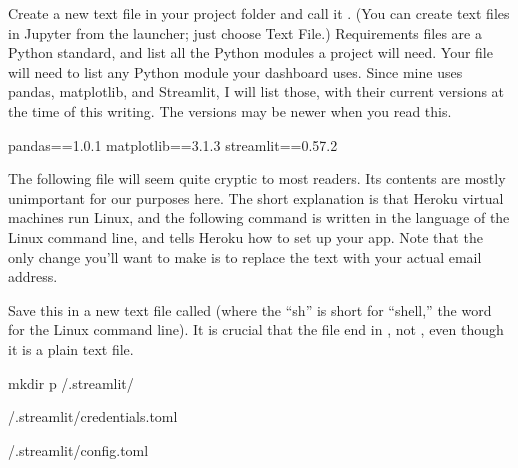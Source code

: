 \documentclass[letterpaper,10pt,english]{sphinxmanual}
\begin{document}
 Create a new text file in your project folder and call it .  (You can create text files in Jupyter from the launcher; just choose Text File.)  Requirements files are a Python standard, and list all the Python modules a project will need.  Your  file will need to list any Python module your dashboard uses.  Since mine uses pandas, matplotlib, and Streamlit, I will list those, with their current versions at the time of this writing.  The versions may be newer when you read this.

\begin{sphinxVerbatim}[commandchars=\\\{\}]
pandas==1.0.1
matplotlib==3.1.3
streamlit==0.57.2
\end{sphinxVerbatim}

 The following file will seem quite cryptic to most readers.  Its contents are mostly unimportant for our purposes here.  The short explanation is that Heroku virtual machines run Linux, and the following command is written in the language of the Linux command line, and tells Heroku how to set up your app.  Note that the only change you’ll want to make is to replace the text  with your actual email address.

Save this in a new text file called  (where the “sh” is short for “shell,” the word for the Linux command line).  It is crucial that the file end in , not , even though it is a plain text file.

\begin{sphinxVerbatim}[commandchars=\\\{\}]
mkdir \PYGZhy{}p \PYGZti{}/.streamlit/

 
 \PYGZgt{} \PYGZti{}/.streamlit/credentials.toml

 
 \PYGZgt{} \PYGZti{}/.streamlit/config.toml
\end{sphinxVerbatim}
\end{document}
